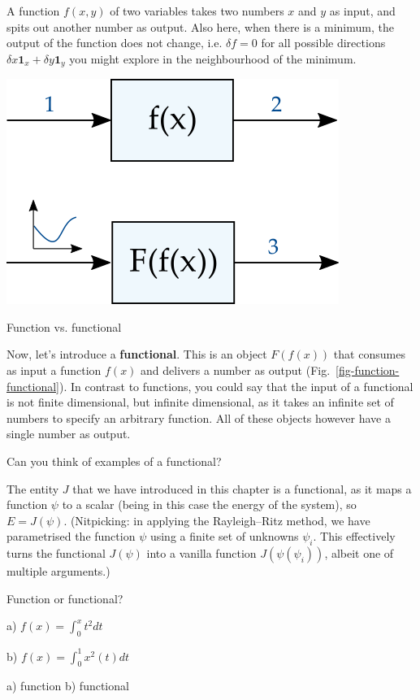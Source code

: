 A function $f(x,y)$ of two variables takes two numbers $x$ and $y$ as input, and spits out another number as output. Also here, when there is a minimum, the output of the function does not change, i.e. $\delta f=0$ for all possible directions  $\delta x \mathbf{1}_x  + \delta y\mathbf{1}_y$ you might explore in the neighbourhood of the minimum.

\begin{marginfigure}[-1.5cm]
  \includegraphics{numeric/figures/function_functional}
  \caption{Function vs. functional}
  \label{fig-function-functional}
\end{marginfigure}

Now, let's introduce a \textbf{functional}. This is an object $F(f(x))$ that consumes as input a function $f(x)$ and delivers a number as output (Fig.~\ref{fig-function-functional}). In contrast to functions, you could say that the input of a functional is not finite dimensional, but infinite dimensional, as it takes an infinite set of numbers to specify an arbitrary function. All of these objects however have a single number as output.

\begin{cue}
Can you think of examples of a functional?  
\end{cue}

The entity $J$ that we have introduced in this chapter is a functional, as it maps a function $\psi$ to a scalar (being in this case the energy of the system), so $E=J(\psi)$. (Nitpicking: in applying the Rayleigh--Ritz method, we have parametrised the function $\psi$ using a finite set of unknowns $\psi_i$. This effectively turns the functional $J(\psi)$ into a vanilla function $J(\psi(\psi_i))$, albeit one of multiple arguments.)

\begin{exer}
  Function or functional?

  a) $f(x)=\int_0^x t^2 dt$

  b) $f(x)=\int_0^1 x^2(t) dt$
  \begin{sol}
    a) function b) functional
  \end{sol}
\end{exer}

